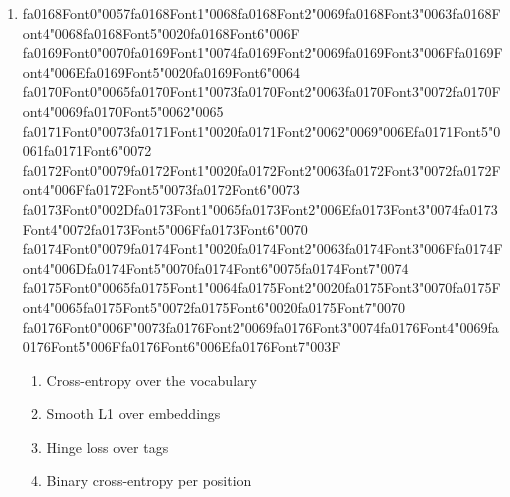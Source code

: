 \documentclass[12pt]{article}
\begin{document}
\begin{enumerate}[label=Q\arabic*.]
 \item {\csname fa0168Font0\endcsname\char"0057}{\csname fa0168Font1\endcsname\char"0068}{\csname fa0168Font2\endcsname\char"0069}{\csname fa0168Font3\endcsname\char"0063}{\csname fa0168Font4\endcsname\char"0068}{\csname fa0168Font5\endcsname\char"0020}{\csname fa0168Font6\endcsname\char"006F} {\csname fa0169Font0\endcsname\char"0070}{\csname fa0169Font1\endcsname\char"0074}{\csname fa0169Font2\endcsname\char"0069}{\csname fa0169Font3\endcsname\char"006F}{\csname fa0169Font4\endcsname\char"006E}{\csname fa0169Font5\endcsname\char"0020}{\csname fa0169Font6\endcsname\char"0064} {\csname fa0170Font0\endcsname\char"0065}{\csname fa0170Font1\endcsname\char"0073}{\csname fa0170Font2\endcsname\char"0063}{\csname fa0170Font3\endcsname\char"0072}{\csname fa0170Font4\endcsname\char"0069}{\csname fa0170Font5\endcsname\char"0062}{\char"0065} {\csname fa0171Font0\endcsname\char"0073}{\csname fa0171Font1\endcsname\char"0020}{\csname fa0171Font2\endcsname\char"0062}{\char"0069}{\char"006E}{\csname fa0171Font5\endcsname\char"0061}{\csname fa0171Font6\endcsname\char"0072} {\csname fa0172Font0\endcsname\char"0079}{\csname fa0172Font1\endcsname\char"0020}{\csname fa0172Font2\endcsname\char"0063}{\csname fa0172Font3\endcsname\char"0072}{\csname fa0172Font4\endcsname\char"006F}{\csname fa0172Font5\endcsname\char"0073}{\csname fa0172Font6\endcsname\char"0073} {\csname fa0173Font0\endcsname\char"002D}{\csname fa0173Font1\endcsname\char"0065}{\csname fa0173Font2\endcsname\char"006E}{\csname fa0173Font3\endcsname\char"0074}{\csname fa0173Font4\endcsname\char"0072}{\csname fa0173Font5\endcsname\char"006F}{\csname fa0173Font6\endcsname\char"0070} {\csname fa0174Font0\endcsname\char"0079}{\csname fa0174Font1\endcsname\char"0020}{\csname fa0174Font2\endcsname\char"0063}{\csname fa0174Font3\endcsname\char"006F}{\csname fa0174Font4\endcsname\char"006D}{\csname fa0174Font5\endcsname\char"0070}{\csname fa0174Font6\endcsname\char"0075}{\csname fa0174Font7\endcsname\char"0074} {\csname fa0175Font0\endcsname\char"0065}{\csname fa0175Font1\endcsname\char"0064}{\csname fa0175Font2\endcsname\char"0020}{\csname fa0175Font3\endcsname\char"0070}{\csname fa0175Font4\endcsname\char"0065}{\csname fa0175Font5\endcsname\char"0072}{\csname fa0175Font6\endcsname\char"0020}{\csname fa0175Font7\endcsname\char"0070} {\csname fa0176Font0\endcsname\char"006F}{\char"0073}{\csname fa0176Font2\endcsname\char"0069}{\csname fa0176Font3\endcsname\char"0074}{\csname fa0176Font4\endcsname\char"0069}{\csname fa0176Font5\endcsname\char"006F}{\csname fa0176Font6\endcsname\char"006E}{\csname fa0176Font7\endcsname\char"003F}
 \begin{enumerate}[label=(\Alph*)]
     \item Cross-entropy over the vocabulary
     \item Smooth L1 over embeddings
     \item Hinge loss over tags
     \item Binary cross-entropy per position
 \end{enumerate}
 

\end{enumerate}
\end{document}
